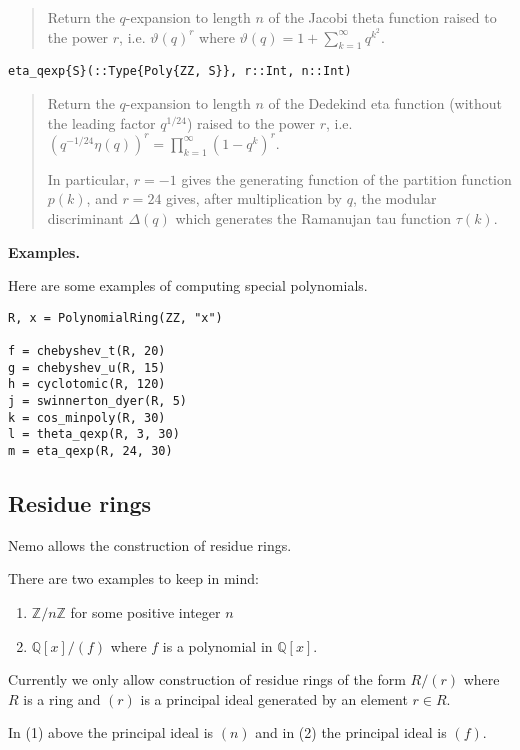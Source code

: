 \documentclass[a4paper,10pt]{article}
\newcommand{\Z}{\mathbb{Z}}
\newcommand{\Q}{\mathbb{Q}}
\newcommand{\desc}[1]{\vspace{-3mm}\begin{quote}#1\end{quote}}
\begin{document}
{{{\desc{Return the $q$-expansion to length $n$ of the Jacobi theta function raised to 
the power $r$, i.e. $\vartheta(q)^r$ where 
$\vartheta(q) = 1 + \sum_{k=1}^{\infty} q^{k^2}$.}

\begin{lstlisting}
eta_qexp{S}(::Type{Poly{ZZ, S}}, r::Int, n::Int)
\end{lstlisting}

\desc{Return the $q$-expansion to length $n$ of the Dedekind eta function (without 
the leading factor $q^{1/24}$) raised to the power $r$, i.e. $(q^{-1/24} \eta(q))^r 
= \prod_{k=1}^{\infty} (1 - q^k)^r$.

In particular, $r = -1$ gives the generating function of the partition function $p(k)$, 
and $r = 24$ gives, after multiplication by $q$, the modular discriminant $\Delta(q)$ 
which generates the Ramanujan tau function $\tau(k)$.}

\textbf{Examples.}

Here are some examples of computing special polynomials.

\begin{lstlisting}
R, x = PolynomialRing(ZZ, "x")

f = chebyshev_t(R, 20)
g = chebyshev_u(R, 15)
h = cyclotomic(R, 120)
j = swinnerton_dyer(R, 5)
k = cos_minpoly(R, 30)
l = theta_qexp(R, 3, 30)
m = eta_qexp(R, 24, 30)
\end{lstlisting}

\subsection{Residue rings}

Nemo allows the construction of residue rings. 

There are two examples to keep in mind:

\begin{enumerate}
\item $\Z/n\Z$ for some positive integer $n$

\item $\Q[x]/(f)$ where $f$ is a polynomial in $\Q[x]$.
\end{enumerate}

Currently we only allow construction of residue rings of the form $R/(r)$ where
$R$ is a ring and $(r)$ is a principal ideal generated by an element $r \in R$. 

In (1) above the principal ideal is $(n)$ and in (2) the principal
ideal is $(f)$.

}}}
\end{document}
